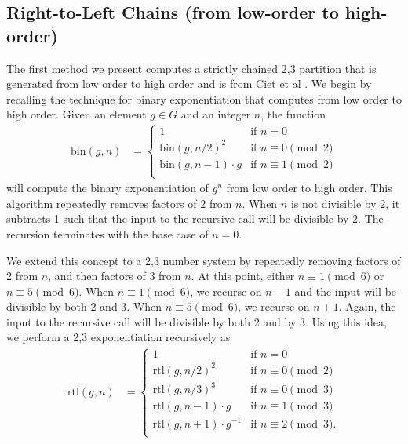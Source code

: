 \documentclass{ucalgthes1}
\theoremstyle{definition}
\begin{document}
\subsection{Right-to-Left Chains (from low-order to high-order)}
\label{subsec:rtolChains}

The first method we present computes a strictly chained 2,3 partition that is generated from low order to high order and is from Ciet et al \cite{Ciet2006}.  We begin by recalling the technique for binary exponentiation that computes from low order to high order.  Given an element $g \in G$ and an integer $n$, the function
\begin{align*}
\textrm{bin}(g, n) &= \begin{cases}
               1 & \textrm{if $n = 0$} \\
               {\textrm{bin}(g, n/2)}^2 & \textrm{if $n \equiv 0 \pmod 2$} \\
               \textrm{bin}(g, n-1) \cdot g & \textrm{if $n \equiv 1 \pmod 2$} \\
	       \end{cases}
\end{align*}
will compute the binary exponentiation of $g^n$ from low order to high order. This algorithm repeatedly removes factors of 2 from $n$.  When $n$ is not divisible by 2, it subtracts 1 such that the input to the recursive call will be divisible by 2.  The recursion terminates with the base case of $n=0$.

We extend this concept to a 2,3 number system by repeatedly removing factors of 2 from $n$, and then factors of 3 from $n$.  At this point, either $n \equiv 1 \pmod 6$ or $n \equiv 5 \pmod 6$.  When $n \equiv 1 \pmod 6$, we recurse on $n-1$ and the input will be divisible by both 2 and 3.  When $n \equiv 5 \pmod 6$, we recurse on $n+1$.  Again, the input to the recursive call will be divisible by both 2 and by 3.  Using this idea, we perform a 2,3 exponentiation recursively as
\newcommand{\rtol}{\textrm{rtl}}
\begin{align*}
\rtol(g, n) &= \begin{cases}
               1 & \textrm{if $n = 0$} \\
               {\rtol(g, n/2)}^2 & \textrm{if $n \equiv 0 \pmod 2$} \\
               {\rtol(g, n/3)}^3 & \textrm{if $n \equiv 0 \pmod 3$} \\
               \rtol(g, n-1) \cdot g & \textrm{if $n \equiv 1 \pmod 3$} \\
               \rtol(g, n+1) \cdot g^{-1} & \textrm{if $n \equiv 2 \pmod 3$}. \\
	       \end{cases}
\end{align*}
\end{document}
